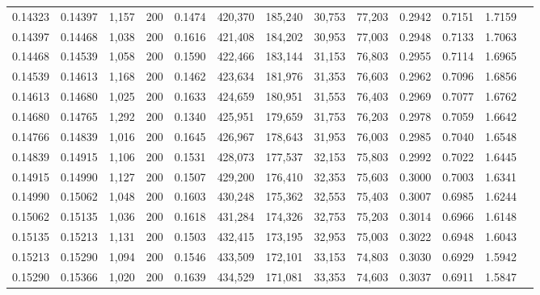 \begin{tabular}{rrrrrrrrrrrrr}
0.14323 & 0.14397 &  1,157 & 200 &                                     0.1474 & 420,370 & 185,240 &  30,753 &  77,203 & 0.2942 & 0.7151 & 1.7159 \\
0.14397 & 0.14468 &  1,038 & 200 &                                     0.1616 & 421,408 & 184,202 &  30,953 &  77,003 & 0.2948 & 0.7133 & 1.7063 \\
0.14468 & 0.14539 &  1,058 & 200 &                                     0.1590 & 422,466 & 183,144 &  31,153 &  76,803 & 0.2955 & 0.7114 & 1.6965 \\
0.14539 & 0.14613 &  1,168 & 200 &                                     0.1462 & 423,634 & 181,976 &  31,353 &  76,603 & 0.2962 & 0.7096 & 1.6856 \\
0.14613 & 0.14680 &  1,025 & 200 &                                     0.1633 & 424,659 & 180,951 &  31,553 &  76,403 & 0.2969 & 0.7077 & 1.6762 \\
0.14680 & 0.14765 &  1,292 & 200 &                                     0.1340 & 425,951 & 179,659 &  31,753 &  76,203 & 0.2978 & 0.7059 & 1.6642 \\
0.14766 & 0.14839 &  1,016 & 200 &                                     0.1645 & 426,967 & 178,643 &  31,953 &  76,003 & 0.2985 & 0.7040 & 1.6548 \\
0.14839 & 0.14915 &  1,106 & 200 &                                     0.1531 & 428,073 & 177,537 &  32,153 &  75,803 & 0.2992 & 0.7022 & 1.6445 \\
0.14915 & 0.14990 &  1,127 & 200 &                                     0.1507 & 429,200 & 176,410 &  32,353 &  75,603 & 0.3000 & 0.7003 & 1.6341 \\
0.14990 & 0.15062 &  1,048 & 200 &                                     0.1603 & 430,248 & 175,362 &  32,553 &  75,403 & 0.3007 & 0.6985 & 1.6244 \\
0.15062 & 0.15135 &  1,036 & 200 &                                     0.1618 & 431,284 & 174,326 &  32,753 &  75,203 & 0.3014 & 0.6966 & 1.6148 \\
0.15135 & 0.15213 &  1,131 & 200 &                                     0.1503 & 432,415 & 173,195 &  32,953 &  75,003 & 0.3022 & 0.6948 & 1.6043 \\
0.15213 & 0.15290 &  1,094 & 200 &                                     0.1546 & 433,509 & 172,101 &  33,153 &  74,803 & 0.3030 & 0.6929 & 1.5942 \\
0.15290 & 0.15366 &  1,020 & 200 &                                     0.1639 & 434,529 & 171,081 &  33,353 &  74,603 & 0.3037 & 0.6911 & 1.5847 \\

\end{tabular}
